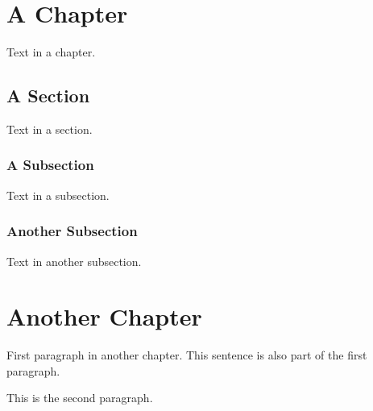 \documentclass[a4paper]{report}
\begin{document}
\tableofcontents

\chapter{A Chapter}
Text in a chapter.

\section{A Section}
Text in a section.

\subsection{A Subsection}
Text in a subsection.

\subsection{Another Subsection}
Text in another subsection.

\chapter{Another Chapter}
First paragraph in another chapter.
This sentence is also part of the first paragraph.

This is the second paragraph.
\end{document}
